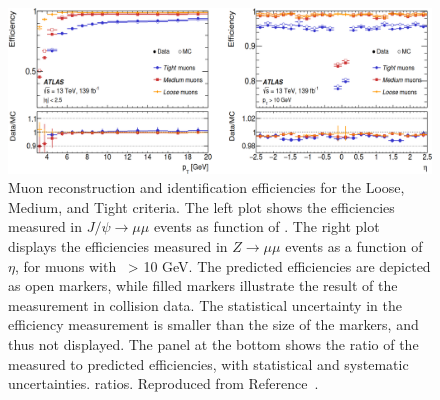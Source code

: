 \begin{figure}[bht]
    \begin{centering}	
    \includegraphics[width=1.0\textwidth]{Reconstruction_plots/muon_ID.png}
    \caption{
        Muon reconstruction and identification efficiencies for the Loose, Medium, and Tight criteria. 
        The left plot shows the efficiencies measured in $J/\psi \rightarrow \mu\mu$ events as function of \pt. 
        The right plot displays the efficiencies measured in $Z \rightarrow \mu\mu$ events as a function of $\eta$, 
        for muons with \pt\ > 10 GeV. The predicted efficiencies are depicted as open markers, 
        while filled markers illustrate the result of the measurement in collision data. 
        The statistical uncertainty in the efficiency measurement is smaller than the size of the markers, 
        and thus not displayed. The panel at the bottom shows the ratio of the measured to predicted efficiencies, 
        with statistical and systematic uncertainties.
    ratios. Reproduced from Reference~\cite{CERN-EP-2020-199}.}
    \label{fig:muon_ID}
    \end{centering}
\end{figure}
